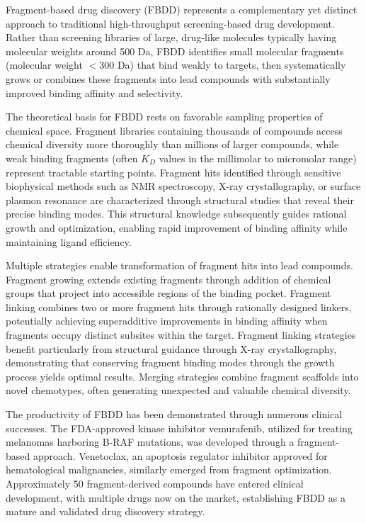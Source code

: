 \documentclass[12pt,a4paper]{article}
\begin{document}
Fragment-based drug discovery (FBDD) represents a complementary yet distinct approach to traditional high-throughput screening-based drug development. Rather than screening libraries of large, drug-like molecules typically having molecular weights around 500 Da, FBDD identifies small molecular fragments (molecular weight $<$300 Da) that bind weakly to targets, then systematically grows or combines these fragments into lead compounds with substantially improved binding affinity and selectivity.

The theoretical basis for FBDD rests on favorable sampling properties of chemical space. Fragment libraries containing thousands of compounds access chemical diversity more thoroughly than millions of larger compounds, while weak binding fragments (often $K_D$ values in the millimolar to micromolar range) represent tractable starting points. Fragment hits identified through sensitive biophysical methods such as NMR spectroscopy, X-ray crystallography, or surface plasmon resonance are characterized through structural studies that reveal their precise binding modes. This structural knowledge subsequently guides rational growth and optimization, enabling rapid improvement of binding affinity while maintaining ligand efficiency.

Multiple strategies enable transformation of fragment hits into lead compounds. Fragment growing extends existing fragments through addition of chemical groups that project into accessible regions of the binding pocket. Fragment linking combines two or more fragment hits through rationally designed linkers, potentially achieving superadditive improvements in binding affinity when fragments occupy distinct subsites within the target. Fragment linking strategies benefit particularly from structural guidance through X-ray crystallography, demonstrating that conserving fragment binding modes through the growth process yields optimal results. Merging strategies combine fragment scaffolds into novel chemotypes, often generating unexpected and valuable chemical diversity.

The productivity of FBDD has been demonstrated through numerous clinical successes. The FDA-approved kinase inhibitor vemurafenib, utilized for treating melanomas harboring B-RAF mutations, was developed through a fragment-based approach. Venetoclax, an apoptosis regulator inhibitor approved for hematological malignancies, similarly emerged from fragment optimization. Approximately 50 fragment-derived compounds have entered clinical development, with multiple drugs now on the market, establishing FBDD as a mature and validated drug discovery strategy.
\end{document}
